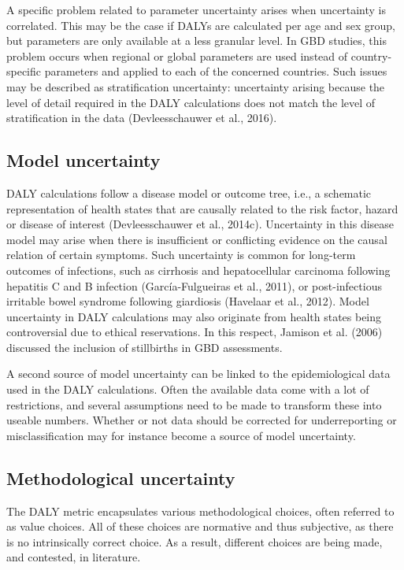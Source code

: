 \documentclass[]{book}
\begin{document}
A specific problem related to parameter uncertainty arises when
uncertainty is correlated. This may be the case if DALYs are calculated
per age and sex group, but parameters are only available at a less
granular level. In GBD studies, this problem occurs when regional or
global parameters are used instead of country-specific parameters and
applied to each of the concerned countries. Such issues may be described
as stratification uncertainty: uncertainty arising because the level of
detail required in the DALY calculations does not match the level of
stratification in the data (Devleesschauwer et al., 2016).

\subsection{Model uncertainty}\label{model-uncertainty}

DALY calculations follow a disease model or outcome tree, i.e., a
schematic representation of health states that are causally related to
the risk factor, hazard or disease of interest (Devleesschauwer et al.,
2014c). Uncertainty in this disease model may arise when there is
insufficient or conflicting evidence on the causal relation of certain
symptoms. Such uncertainty is common for long-term outcomes of
infections, such as cirrhosis and hepatocellular carcinoma following
hepatitis C and B infection (García-Fulgueiras et al., 2011), or
post-infectious irritable bowel syndrome following giardiosis (Havelaar
et al., 2012). Model uncertainty in DALY calculations may also originate
from health states being controversial due to ethical reservations. In
this respect, Jamison et al. (2006) discussed the inclusion of
stillbirths in GBD assessments.

A second source of model uncertainty can be linked to the
epidemiological data used in the DALY calculations. Often the available
data come with a lot of restrictions, and several assumptions need to be
made to transform these into useable numbers. Whether or not data should
be corrected for underreporting or misclassification may for instance
become a source of model uncertainty.

\subsection{Methodological
uncertainty}\label{methodological-uncertainty}

The DALY metric encapsulates various methodological choices, often
referred to as value choices. All of these choices are normative and
thus subjective, as there is no intrinsically correct choice. As a
result, different choices are being made, and contested, in literature.
\end{document}
